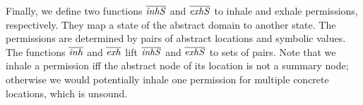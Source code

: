 \documentclass{llncs}
\begin{document}

Finally, we define two functions $\overline{\mathit{inhS}}$ and
$\overline{\mathit{exhS}}$ to inhale and exhale permissions,
respectively. They map a state of the abstract domain to another
state. The permissions are determined by pairs of abstract locations
and symbolic values. The functions $\overline{\mathit{inh}}$ and
$\overline{\mathit{exh}}$ lift $\overline{\mathit{inhS}}$ and
$\overline{\mathit{exhS}}$ to sets of pairs.
Note that we inhale a permission iff the abstract node of its location
is not a summary node; otherwise we would potentially inhale one
permission for multiple concrete locations, which is unsound.
\end{document}
